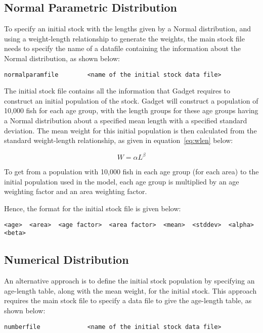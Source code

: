 \documentclass[10pt,twoside]{book}
\begin{document}
\subsection{Normal Parametric Distribution}
To specify an initial stock with the lengths given by a Normal distribution, and using a weight-length relationship to generate the weights, the main stock file needs to specify the name of a datafile containing the information about the Normal distribution, as shown below:

{\small\begin{verbatim}
normalparamfile        <name of the initial stock data file>
\end{verbatim}}

The initial stock file contains all the information that Gadget requires to construct an initial population of the stock.  Gadget will construct a population of 10,000 fish for each age group, with the length groups for these age groups having a Normal distribution about a specified mean length with a specified standard deviation.  The mean weight for this initial population is then calculated from the standard weight-length relationship, as given in equation~\ref{eq:wlen} below:

\begin{equation}\label{eq:wlen}
W = \alpha L^{\beta}
\end{equation}

\bigskip
To get from a population with 10,000 fish in each age group (for each area) to the initial population used in the model, each age group is multiplied by an age weighting factor and an area weighting factor.

\bigskip
Hence, the format for the initial stock file is given below:

{\small\begin{verbatim}
<age>  <area>  <age factor>  <area factor>  <mean>  <stddev>  <alpha>  <beta>
\end{verbatim}}

\subsection{Numerical Distribution}
An alternative approach is to define the initial stock population by specifying an age-length table, along with the mean weight, for the initial stock.  This approach requires the main stock file to specify a data file to give the age-length table, as shown below:

{\small\begin{verbatim}
numberfile             <name of the initial stock data file>
\end{verbatim}}
\end{document}
